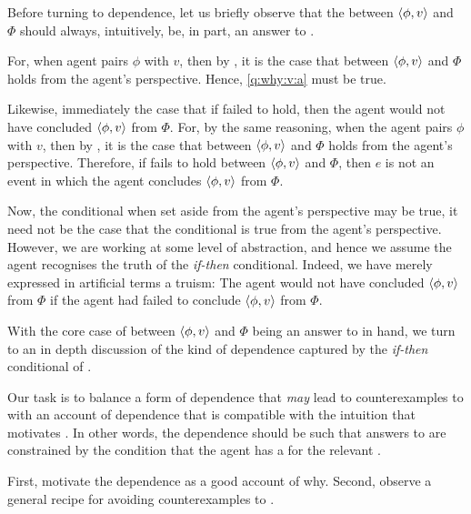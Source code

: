 \begin{note}
  Before turning to dependence, let us briefly observe that the \ros{} between \(\langle \phi, v \rangle\) and \(\Phi\) should always, intuitively, be, in part, an answer to \qWhyV{}.

  For, when agent pairs \(\phi\) with \(v\), then by \supportI{}, it is the case that \ros{} between \(\langle \phi, v \rangle\) and \(\Phi\) holds from the agent's perspective.
  Hence, \ref{q:why:v:a} must be true.

  Likewise, immediately the case that if \support{} failed to hold, then the agent would not have concluded \(\langle \phi, v \rangle\) from \(\Phi\).
  For, by the same reasoning, when the agent pairs \(\phi\) with \(v\), then by \supportI{}, it is the case that \ros{} between \(\langle \phi, v \rangle\) and \(\Phi\) holds from the agent's perspective.
  Therefore, if \support{} fails to hold between \(\langle \phi, v \rangle\) and \(\Phi\), then \(e\) is not an event in which the agent concludes \(\langle \phi, v \rangle\) from \(\Phi\).

  Now, the conditional when set aside from the agent's perspective may be true, it need not be the case that the conditional is true from the agent's perspective.
  However, we are working at some level of abstraction, and hence we assume the agent recognises the truth of the \emph{if-then} conditional.
  Indeed, we have merely expressed in artificial terms a truism:
  The agent would not have concluded \(\langle \phi, v \rangle\) from \(\Phi\) if the agent had failed to conclude \(\langle \phi, v \rangle\) from \(\Phi\).
\end{note}

\begin{note}
  With the core case of \support{} between \(\langle \phi, v \rangle\) and \(\Phi\) being an answer to \qWhyV{} in hand, we turn to an in depth discussion of the kind of dependence captured by the \emph{if-then} conditional of \qWhyV{}.

  Our task is to balance a form of dependence that \emph{may} lead to counterexamples to \issueInclusion{} with an account of dependence that is compatible with the intuition that motivates \issueInclusion{}.
  In other words, the dependence should be such that answers to \qWhyV{} are constrained by the condition that the agent has a \witness{} for the relevant \ros{}.
\end{note}

\begin{note}
  First, motivate the dependence as a good account of why.
  Second, observe a general recipe for avoiding counterexamples to \issueInclusion{}.
\end{note}


